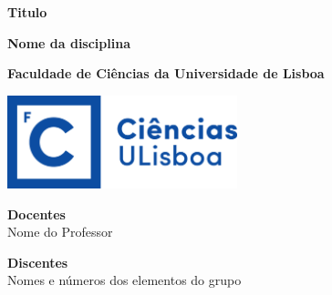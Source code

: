 \begin{titlepage}
    \begin{center}
        \vspace*{1cm}
            
        \Huge
        \textbf{Titulo}
            
        \vspace{1.0cm}
        \Large
        \textbf{Nome da disciplina}
        
        \LARGE
        \vspace{1.0cm}
        \textbf{Faculdade de Ciências da Universidade de Lisboa}
        
        \vspace{1.5cm}
        \includegraphics[width=0.5\textwidth]{img/logo_fcul.png}
            
        \vfill
        
        \Large
        \textbf{Docentes}\\
        Nome do Professor
            
        \vspace{0.8cm}
        \textbf{Discentes}\\
        Nomes e números dos elementos do grupo
            
    \end{center}
\end{titlepage}